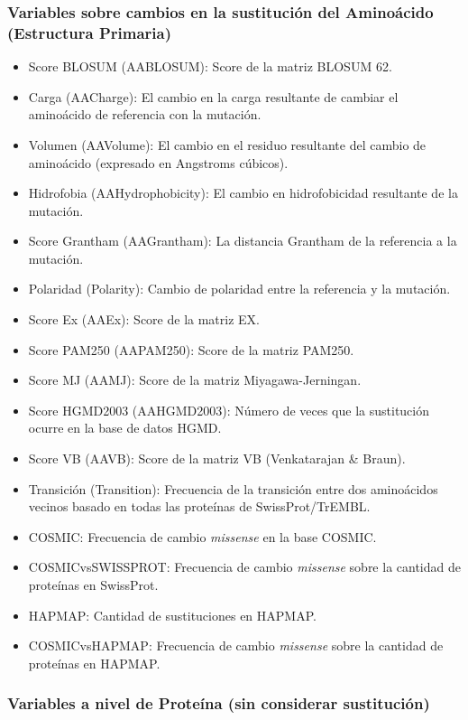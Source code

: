 \subsubsection{Variables sobre cambios en la sustitución del Aminoácido (Estructura Primaria)}
\begin{itemize}
    \item Score BLOSUM (AABLOSUM): Score de la matriz BLOSUM 62.
    \item Carga (AACharge): El cambio en la carga resultante de cambiar el aminoácido de referencia con la mutación.
    \item Volumen (AAVolume): El cambio en el residuo resultante del cambio de aminoácido (expresado en Angstroms cúbicos).
    \item Hidrofobia (AAHydrophobicity): El cambio en hidrofobicidad resultante de la mutación.
    \item Score Grantham (AAGrantham): La distancia Grantham de la referencia a la mutación.
    \item Polaridad (Polarity): Cambio de polaridad entre la referencia y la mutación.
    \item Score Ex (AAEx): Score de la matriz EX.
    \item Score PAM250 (AAPAM250): Score de la matriz PAM250.
    \item Score MJ (AAMJ): Score de la matriz Miyagawa-Jerningan.
    \item Score HGMD2003 (AAHGMD2003): Número de veces que la sustitución ocurre en la base de datos HGMD.
    \item Score VB (AAVB): Score de la matriz VB (Venkatarajan \& Braun).
    \item Transición (Transition): Frecuencia de la transición entre dos aminoácidos vecinos basado en todas las proteínas de SwissProt/TrEMBL.
    \item COSMIC: Frecuencia de cambio \textit{missense} en la base COSMIC.
    \item COSMICvsSWISSPROT: Frecuencia de cambio \textit{missense} sobre la cantidad de proteínas en SwissProt.
    \item HAPMAP: Cantidad de sustituciones en HAPMAP.
    \item COSMICvsHAPMAP: Frecuencia de cambio \textit{missense} sobre la cantidad de proteínas en HAPMAP.
\end{itemize}

\subsubsection{Variables a nivel de Proteína (sin considerar sustitución)}

